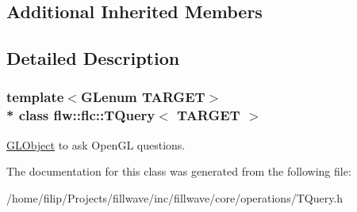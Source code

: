 \subsection*{Additional Inherited Members}


\subsection{Detailed Description}
\subsubsection*{template$<$G\+Lenum T\+A\+R\+G\+ET$>$\\*
class flw\+::flc\+::\+T\+Query$<$ T\+A\+R\+G\+E\+T $>$}

\hyperlink{classflw_1_1flc_1_1GLObject}{G\+L\+Object} to ask Open\+GL questions. 

The documentation for this class was generated from the following file\+:\begin{DoxyCompactItemize}
\item 
/home/filip/\+Projects/fillwave/inc/fillwave/core/operations/T\+Query.\+h\end{DoxyCompactItemize}

